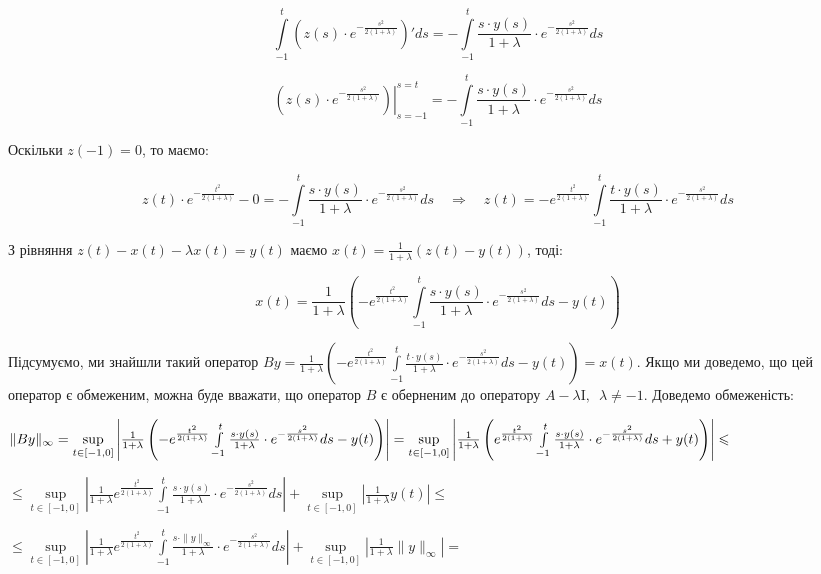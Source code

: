 \documentclass[a5paper, 20pt, titlepage]{article}
\newcommand{\Sup}[1]{\sup \limits_{t \in [-1, 0]} \left| #1 \right|}
\newcommand{\I}{\mathrm{I}}
\begin{document}
$$ \int \limits_{-1}^{t} \left( z(s) \cdot e^{-\frac{s^2}{2(1+\lambda)}} \right)' ds = - \int \limits_{-1}^{t} \frac{s \cdot y(s)}{1+ \lambda} \cdot e^{-\frac{s^2}{2(1+\lambda)}} ds$$ 

$$ \left. \left( z(s) \cdot e^{-\frac{s^2}{2(1+\lambda)}} \right) \right|_{s = -1}^{s = t} = - \int \limits_{-1}^{t} \frac{s \cdot y(s)}{1+ \lambda} \cdot e^{-\frac{s^2}{2(1+\lambda)}} ds$$ 

Оскільки $z(-1) = 0$, то маємо:

$$ z(t) \cdot e^{-\frac{t^2}{2(1+\lambda)}} - 0 = - \int \limits_{-1}^{t} \frac{s \cdot y(s)}{1+ \lambda} \cdot e^{-\frac{s^2}{2(1+\lambda)}} ds 
\quad \Rightarrow \quad z(t) = - e^{\frac{t^2}{2(1+\lambda)}} \int \limits_{-1}^{t} \frac{t \cdot y(s)}{1+ \lambda} \cdot e^{-\frac{s^2}{2(1+\lambda)}} ds $$

З рівняння $z(t) - x(t) - \lambda x(t) = y(t)$ маємо $x(t) = \frac{1}{1 + \lambda} \left( z(t) - y(t)\right)$, тоді:

$$ x(t) =  \frac{1}{1 + \lambda} \left( - e^{\frac{t^2}{2(1+\lambda)}} \int \limits_{-1}^{t} \frac{s \cdot y(s)}{1+ \lambda} \cdot e^{-\frac{s^2}{2(1+\lambda)}} ds - y(t)\right) $$

Підсумуємо, ми знайшли такий оператор $By =  \frac{1}{1 + \lambda} \left( - e^{\frac{t^2}{2(1+\lambda)}} \int \limits_{-1}^{t} \frac{t \cdot y(s)}{1+ \lambda} \cdot e^{-\frac{s^2}{2(1+\lambda)}} ds - y(t)\right) = x(t)$. Якщо ми доведемо, що цей оператор є обмеженим, можна буде вважати, що оператор $B$ є оберненим до оператору $A - \lambda  \I, \,\,\, \lambda \neq -1$. Доведемо обмеженість:

\vspace{3mm}
\hspace{-5mm}
$\| By\|_\infty = \Sup{\frac{1}{1 + \lambda} \left( - e^{\frac{t^2}{2(1+\lambda)}} \int \limits_{-1}^{t} \frac{s \cdot y(s)}{1+ \lambda} \cdot e^{-\frac{s^2}{2(1+\lambda)}} ds - y(t)\right)} = \Sup{\frac{1}{1 + \lambda} \left( e^{\frac{t^2}{2(1+\lambda)}} \int \limits_{-1}^{t} \frac{s \cdot y(s)}{1+ \lambda} \cdot e^{-\frac{s^2}{2(1+\lambda)}} ds + y(t)\right)} \nolinebreak \leqslant$

\vspace{3mm}
\hspace{7mm}
$\leqslant \Sup{\frac{1}{1 + \lambda} e^{\frac{t^2}{2(1+\lambda)}} \int \limits_{-1}^{t} \frac{s \cdot y(s)}{1+ \lambda} \cdot e^{-\frac{s^2}{2(1+\lambda)}} ds} + \Sup{\frac{1}{1 + \lambda} y(t)} \leqslant$ 

\vspace{3mm}
\hspace{7mm}
$\leqslant \Sup{\frac{1}{1 + \lambda} e^{\frac{t^2}{2(1+\lambda)}} \int \limits_{-1}^{t} \frac{s \cdot \|y\|_\infty}{1+ \lambda} \cdot e^{-\frac{s^2}{2(1+\lambda)}} ds} + \Sup{\frac{1}{1 + \lambda} \|y\|_\infty} =$
\end{document}
